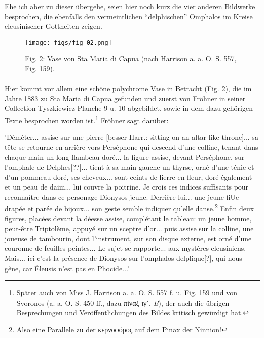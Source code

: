 \documentclass[a4paper, 11pt, oneside]{article}
\begin{document}
Ehe ich aber zu dieser übergehe, seien hier noch kurz die vier anderen Bildwerke besprochen, die ebenfalls den vermeintlichen "`delphischen"' Omphalos im Kreise eleusinischer Gottheiten zeigen.

\begin{figure}[H]
\centering
\texttt{[image: figs/fig-02.png]}
\caption{Fig. 2: Vase von Sta Maria di Capua (nach Harrison a. a. O. S. 557, Fig. 159).}
\end{figure}
\paragraph{}
Hier kommt vor allem eine schöne polychrome Vase in Betracht (Fig. 2), die im Jahre 1883 zu Sta Maria di Capua gefunden und zuerst von Fröhner in seiner Collection Tyszkiewicz Planche 9 u. 10 abgebildet, sowie in dem dazu gehörigen Texte besprochen worden ist.\footnote{Später auch von Miss J. Harrison a. a. O. S. 557 f. u. Fig. 159 und von Svoronos (a. a. O. S. 450 ff., dazu πίναξ ιγʹ, \emph{B}), der auch die übrigen Besprechungen und Veröffentlichungen des Bildes kritisch gewürdigt hat.} Fröhner sagt darüber:

'Démèter... assise sur une pierre [besser Harr.: sitting on an altar-like throne]... sa tête se retourne en arrière vors Perséphone qui descend d'une colline, tenant dans chaque main un long flambeau doré... la figure assise, devant Perséphone, sur l'omphale de Delphes[??]... tient à sa main gauche un thyrse, orné d'une ténie et d'un pommeau doré, ses cheveux... sont ceints de lierre en fleur, doré également et un peau de daim... lui couvre la poitrine. Je crois ces indices suffisants pour reconnaître dans ce personage Dionysos jeune. Derrière lui... une jeune fiUe drapée et parée de bijoux... son geste semble indiquer qu'elle danse.\footnote{Also eine Parallele zu der κερνοφόρος auf dem Pinax der Ninnion!} Enfin deux figures, placées devant la déesse assise, complétant le tableau: un jeune homme, peut-être Triptolème, appuyé sur un sceptre d'or... puis assise sur la colline, une joueuse de tambourin, dont l'instrument, sur son disque externe, est orné d'une couronne de feuilles peintes... Le sujet se rapporte... aux mystères eleusiniens. Mais... ici c'est la présence de Dionysos sur l'omphalos delplique[?], qui nous gêne, car Éleusis n'est pas en Phocide...'
\end{document}
